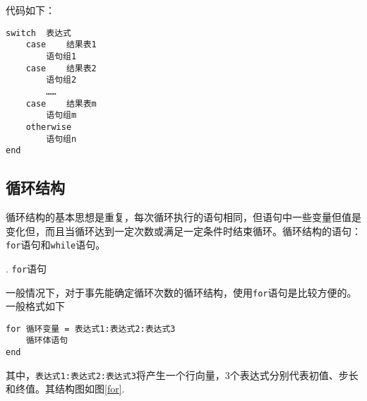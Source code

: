 \noindent 代码如下：
\begin{lstlisting}
switch	表达式
	case	结果表1
		语句组1
	case	结果表2
		语句组2
		……
	case	结果表m
		语句组m
	otherwise
		语句组n
end
\end{lstlisting}

\subsection{循环结构}
循环结构的基本思想是重复，每次循环执行的语句相同，但语句中一些变量但值是变化但，而且当循环达到一定次数或满足一定条件时结束循环。循环结构的语句：\lstinline|for|语句和\lstinline|while|语句。

. \lstinline|for|语句
\par 一般情况下，对于事先能确定循环次数的循环结构，使用\lstinline|for|语句是比较方便的。一般格式如下
\begin{lstlisting}
for 循环变量 = 表达式1:表达式2:表达式3
	循环体语句
end
\end{lstlisting}
其中，\lstinline|表达式1:表达式2:表达式3|将产生一个行向量，3个表达式分别代表初值、步长和终值。其结构图如图\ref{for}.

